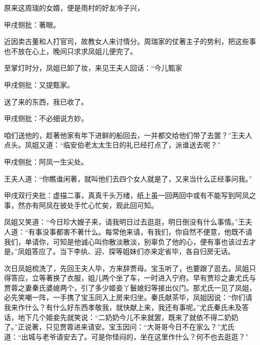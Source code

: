 \begin{parag}


    原来这周瑞的女婿，便是雨村的好友冷子兴，\begin{note}甲戌侧批：著眼。\end{note}近因卖古董和人打官司，故教女人来讨情分。周瑞家的仗著主子的势利，把这些事也不放在心上，晚间只求求凤姐儿便完了。
\end{parag}


\begin{parag}


    至掌灯时分，凤姐已卸了妆，来见王夫人回话：“今儿甄家\begin{note}甲戌侧批：又提甄家。\end{note}送了来的东西，我已收了。\begin{note}甲戌侧批：不必细说方妙。\end{note}咱们送他的，趁著他家有年下进鲜的船回去，一并都交给他们带了去罢？”王夫人点头。凤姐又道：“临安伯老太太生日的礼已经打点了，派谁送去呢？”\begin{note}甲戌侧批：阿凤一生尖处。\end{note}王夫人道：“你瞧谁闲著，就叫他们去四个女人就是了，又来当什么正经事问我。”\begin{note}甲戌双行夹批：虚描二事，真真千头万绪，纸上虽一回两回中或有不能写到阿凤之事，然亦有阿凤在彼处手忙心忙矣，观此回可知。\end{note}凤姐又笑道：“今日珍大嫂子来，请我明日过去逛逛，明日倒没有什么事情。”王夫人道：“有事没事都害不著什么。每常他来请，有我们，你自然不便意，他既不请我们，单请你，可知是他诚心叫你散淡散淡，别辜负了他的心，便有事也该过去才是。”凤姐答应了。当下李纨、迎、探等姐妹们亦来定省毕，各自归房无话。
\end{parag}


\begin{parag}


    次日凤姐梳洗了，先回王夫人毕，方来辞贾母。宝玉听了，也要跟了逛去。凤姐只得答应，立等著换了衣服，姐儿两个坐了车，一时进入宁府。早有贾珍之妻尤氏与贾蓉之妻秦氏婆媳两个，引了多少姬妾丫鬟媳妇等接出仪门。那尤氏一见了凤姐，必先笑嘲一阵，一手携了宝玉同入上房来归坐。秦氏献茶毕，凤姐因说：“你们请我来作什么？有什么好东西孝敬我，就快献上来，我还有事呢。”尤氏秦氏未及答话，地下几个姬妾先就笑说：“二奶奶今儿不来就罢，既来了就依不得二奶奶了。”正说著，只见贾蓉进来请安。宝玉因问：“大哥哥今日不在家么？”尤氏道：“出城与老爷请安去了。可是你怪闷的，坐在这里作什么？何不也去逛逛？”
\end{parag}


